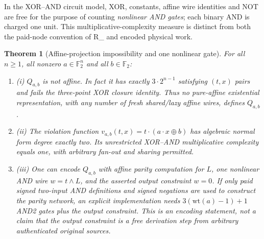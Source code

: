 \documentclass[11pt]{article}
\newtheorem{theorem}{Theorem}
\newcommand{\Rmix}{R_{\mathrm{mix341}}}
\begin{document}
In the XOR--AND circuit model, XOR, constants, affine wire identities and NOT are free for the purpose of counting \emph{nonlinear AND gates}; each binary AND is charged one unit. This multiplicative-complexity measure is distinct from both the paid-node convention of \Rmix{} and encoded physical work.

\begin{theorem}[Affine-projection impossibility and one nonlinear gate]
For all $n\ge1$, all nonzero $a\in\mathbb F_2^n$ and all $b\in\mathbb F_2$:
\begin{enumerate}
\item[] (i) $Q_{a,b}$ is not affine. In fact it has exactly $3\cdot2^{n-1}$ satisfying $(t,x)$ pairs and fails the three-point XOR closure identity. Thus \emph{no} pure-affine existential representation, with any number of fresh shared/lazy affine wires, defines $Q_{a,b}$.
\item[] (ii) The violation function $v_{a,b}(t,x)=t\cdot(a\cdot x\oplus b)$ has algebraic normal form degree exactly two. Its unrestricted XOR--AND multiplicative complexity equals \emph{one}, with arbitrary fan-out and sharing permitted.
\item[] (iii) One can encode $Q_{a,b}$ with affine parity computation for $L$, one nonlinear AND wire $w=t\land L$, and the asserted output constraint $w=0$. If only paid signed two-input AND definitions and signed negations are used to construct the parity network, an explicit implementation needs $3(\mathrm{wt}(a)-1)+1$ AND2 gates plus the output constraint. This is an \emph{encoding} statement, not a claim that the output constraint is a free derivation step from arbitrary authenticated original sources.
\end{enumerate}
\end{theorem}
\end{document}
